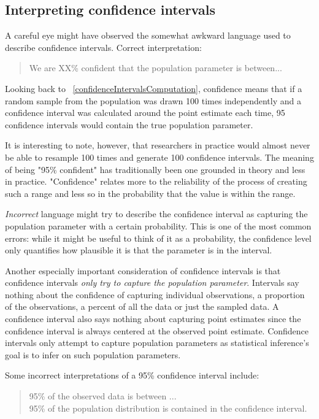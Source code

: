 \subsection{Interpreting confidence intervals}
\label{interpretingCIs}


A careful eye might have observed the somewhat awkward language used to describe confidence intervals. Correct interpretation:
\begin{quote}
We are XX\% confident that the population parameter is between...
\end{quote}

Looking back to ~\ref{confidenceIntervalsComputation}, confidence means that if a random sample from the population was drawn 100 times independently and a confidence interval was calculated around the point estimate each time, 95 confidence intervals would contain the true population parameter. 

It is interesting to note, however, that researchers in practice would almost never be able to resample 100 times and generate 100 confidence intervals. The meaning of being "95\% confident" has traditionally been one grounded in theory and less in practice. "Confidence" relates more to the reliability of the process of creating such a range and less so in the probability that the value is within the range. 

\emph{Incorrect} language might try to describe the confidence interval as capturing the population parameter with a certain probability. This is one of the most common errors: while it might be useful to think of it as a probability, the confidence level only quantifies how plausible it is that the parameter is in the interval. 

Another especially important consideration of confidence intervals is that confidence intervals \emph{only try to capture the population parameter}. Intervals say nothing about the confidence of capturing individual observations, a proportion of the observations, a percent of all the data or just the sampled data. A confidence interval also says nothing about capturing point estimates since the confidence interval is always centered at the observed point estimate. Confidence intervals only attempt to capture population parameters as statistical inference's goal is to infer on such population parameters.

Some incorrect interpretations of a 95\% confidence interval include: 
\begin{quote}
95\% of the observed data is between ...\\
95\% of the population distribution is contained in the confidence interval.\\
\end{quote}

